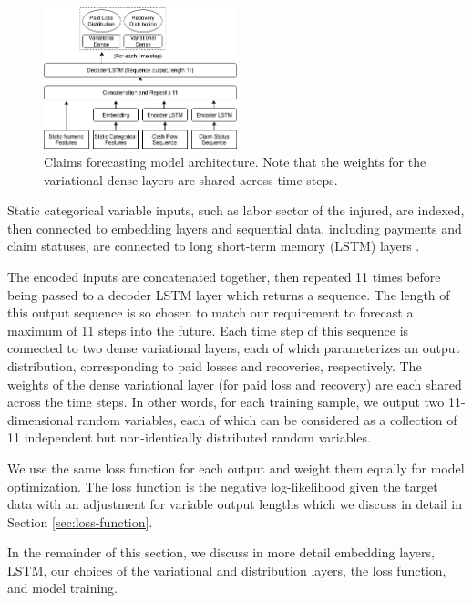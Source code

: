 \documentclass{article}
\begin{document}
\begin{figure}
  \begin{center}
    \includegraphics[width=0.5\textwidth]{images/architecture.png}
  \end{center}
  \caption{Claims forecasting model architecture. Note that the weights for the 
  variational dense layers are shared across time steps.}
  \label{fig:architecture}
\end{figure}

Static categorical variable inputs, such as labor sector of the injured, are 
indexed, then connected to embedding layers \cite{guoEntityEmbeddings2016} and 
sequential data, including payments and claim statuses, are connected to long 
short-term memory (LSTM) layers \cite{hochreiterLongShortterm1997}.

The encoded inputs are concatenated together, then repeated 11 times before being
passed to a decoder LSTM layer which returns a sequence. The length of this 
output sequence is so chosen to match our requirement to forecast a maximum of 
11 steps into the future. Each time step of this sequence is connected to two 
dense variational layers, each of which parameterizes an output distribution, 
corresponding to paid losses and recoveries, respectively. The weights of the 
dense variational layer (for paid loss and recovery) are each shared across the
time steps. In other words, for each training sample, we output two 
11-dimensional random variables, each of which can be considered as a collection
of 11 independent but non-identically distributed random variables.

We use the same loss function for each output and weight them equally for model
optimization. The loss function is the negative log-likelihood given the target 
data with an adjustment for variable output lengths which we discuss in detail 
in Section \ref{sec:loss-function}.

In the remainder of this section, we discuss in more detail embedding layers, 
LSTM, our choices of the variational and distribution layers, the loss function,
and model training.
\end{document}
